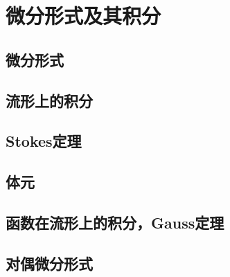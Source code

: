 \chapter{微分形式及其积分}

\section{微分形式}

\section{流形上的积分}

\section{Stokes定理}

\section{体元}

\section{函数在流形上的积分，Gauss定理}

\section{对偶微分形式}

